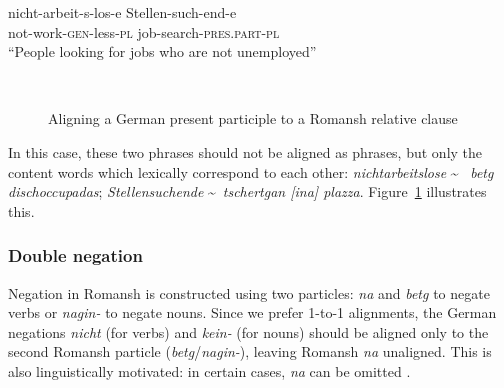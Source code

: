 \begin{exe}
   \ex\label{ex:stellensuchende} 
   \gll nicht-arbeit-s-los-e Stellen-such-end-e  \\
        not-work-\textsc{\acrshort{gen}}-less-\textsc{\acrshort{pl}} job-search-\textsc{\acrshort{pres}.\acrshort{part}}-\textsc{\acrshort{pl}} \\
        \trans \enquote{People looking for jobs who are not unemployed}
\end{exe}

\begin{figure}[ht]
\centering
{}  \

\vspace*{1cm}

          
\caption{Aligning a German present participle to a Romansh relative clause}
\label{fig:align-part1}
\end{figure}

In this case, these two phrases should not be aligned as phrases, but only the content words which lexically correspond to each other: \emph{nichtarbeitslose} \textasciitilde ~ \emph{betg dischoccupadas}; \emph{Stellensuchende} \textasciitilde ~\emph{tschertgan [ina] plazza}. Figure~\ref{fig:align-part1} illustrates this.

\subsubsection{Double negation}
Negation in Romansh is constructed using two particles: \emph{na} and \emph{betg} to negate verbs or \emph{nagin-} to negate nouns. 
Since we prefer 1-to-1 alignments, the German negations \emph{nicht} (for verbs) and \emph{kein-} (for nouns) should be aligned only to the second Romansh particle (\emph{betg}/\emph{nagin-}), leaving Romansh \emph{na} unaligned. 
This is also linguistically motivated: in certain cases, \emph{na} can be omitted \autocite[section 285]{caduff-2008-rumantsch-grischun}. 

